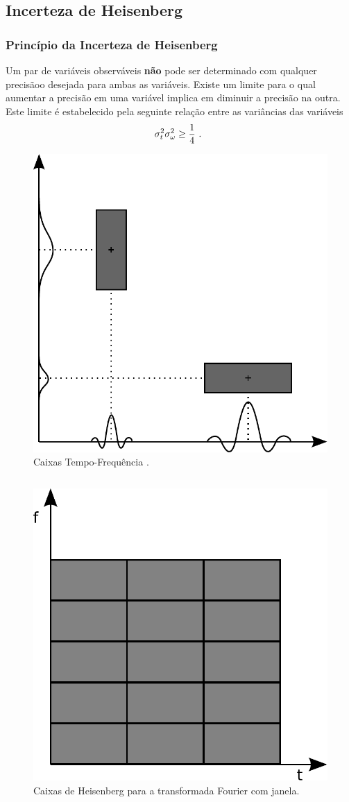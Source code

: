 \subsection{Incerteza de Heisenberg}
\begin{frame}[allowframebreaks]
  \frametitle{Princípio da Incerteza de Heisenberg}
  Um par de variáveis observáveis \textbf{não} pode ser determinado
  com qualquer precisãoo desejada para ambas as variáveis. 
  Existe um limite para o qual aumentar a precisão em
  uma variável implica em diminuir a precisão na outra. 
  Este limite é estabelecido pela seguinte relação
  entre as variâncias das variáveis
  \begin{equation}
  \sigma_{t}^{2}\sigma_{\omega}^{2} \geq \frac{1}{4} \textmd{ . }
  \label{eq:heisenberg_variancias}
  \end{equation}

  \framebreak

  \begin{figure}[hptb]
  \centering
  \includegraphics[width=.4\textwidth]{images/time_freq_box.pdf}
  \caption{Caixas Tempo-Frequência \citep{araujo2007}.}
  \label{fig:caixas_tempo-freq}
  \end{figure}

  \framebreak

  \begin{columns}[c]
  \begin{figure}[hptb]
  \centering
  \includegraphics[width=.7\textwidth]{images/heisenber_boxes_fourier_janela.pdf}
  \caption{Caixas de Heisenberg para a transformada Fourier com janela.}
  \label{fig:caixas_tempo-freq_fourier_janela}
  \end{figure}


\end{columns}
\end{frame}
